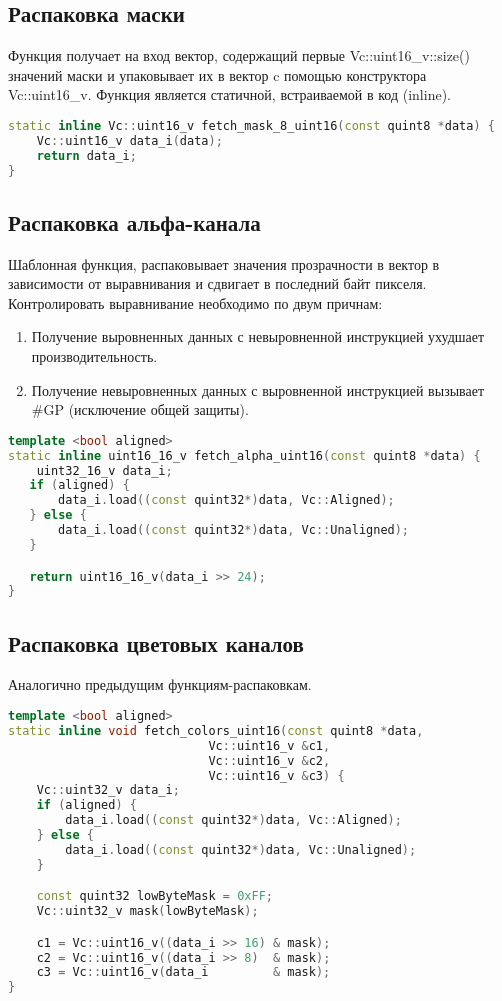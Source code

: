 \subsection{Распаковка маски}
Функция получает на вход вектор, содержащий первые Vc::uint16\_v::size() значений маски и упаковывает их в вектор c помощью конструктора  Vc::uint16\_v. Функция является статичной, встраиваемой в код (inline).

\begin{lstlisting}[language=c++]
static inline Vc::uint16_v fetch_mask_8_uint16(const quint8 *data) {
    Vc::uint16_v data_i(data);
    return data_i;
}
\end{lstlisting}

\subsection{Распаковка альфа-канала}
Шаблонная функция, распаковывает значения прозрачности в вектор в зависимости от выравнивания и сдвигает в последний байт пикселя. Контролировать выравнивание необходимо по двум причнам:
\begin{enumerate}
\item Получение выровненных данных с невыровненной инструкцией ухудшает производительность.  
\item Получение невыровненных данных с выровненной инструкцией вызывает \#GP (исключение общей защиты).
\end{enumerate}

\begin{lstlisting}[language=c++]
template <bool aligned>
static inline uint16_16_v fetch_alpha_uint16(const quint8 *data) {
    uint32_16_v data_i;
   if (aligned) {
       data_i.load((const quint32*)data, Vc::Aligned);
   } else {
       data_i.load((const quint32*)data, Vc::Unaligned);
   }

   return uint16_16_v(data_i >> 24);
}
\end{lstlisting}

\subsection{Распаковка цветовых каналов}
Аналогично предыдущим функциям-распаковкам. 
\begin{lstlisting}[language=c++]
template <bool aligned>
static inline void fetch_colors_uint16(const quint8 *data,
                            Vc::uint16_v &c1,
                            Vc::uint16_v &c2,
                            Vc::uint16_v &c3) {
    Vc::uint32_v data_i;
    if (aligned) {
        data_i.load((const quint32*)data, Vc::Aligned);
    } else {
        data_i.load((const quint32*)data, Vc::Unaligned);
    }

    const quint32 lowByteMask = 0xFF;
    Vc::uint32_v mask(lowByteMask);

    c1 = Vc::uint16_v((data_i >> 16) & mask);
    c2 = Vc::uint16_v((data_i >> 8)  & mask);
    c3 = Vc::uint16_v(data_i         & mask);
}
\end{lstlisting}

